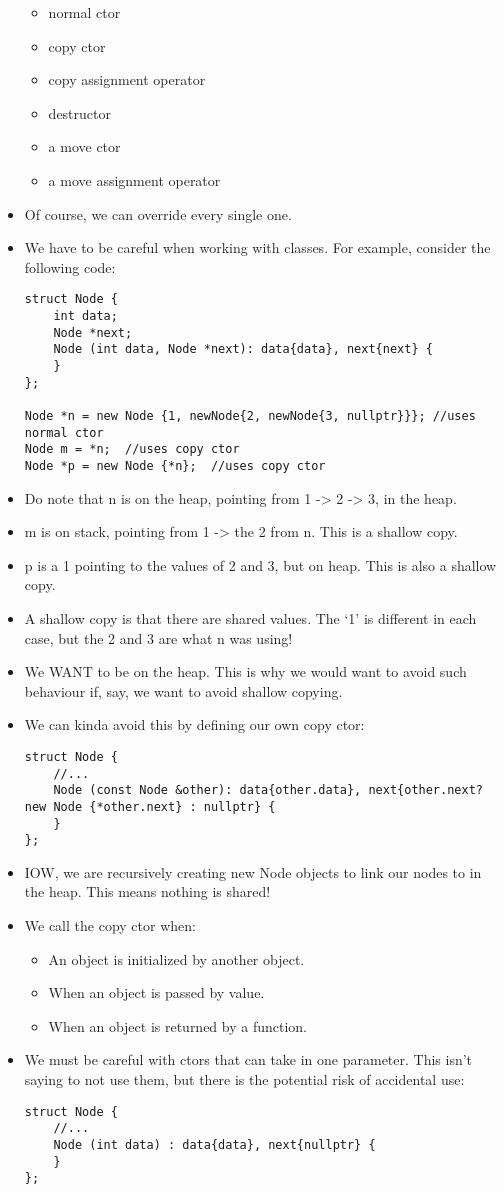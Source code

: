 \documentclass{article}
\begin{document}
\begin{itemize}
\begin{itemize}
\item normal ctor
\item copy ctor
\item copy assignment operator
\item destructor
\item a move ctor
\item a move assignment operator
\end{itemize}
\item Of course, we can override every single one.  
\item We have to be careful when working with classes.  For example, consider the following code:
\begin{lstlisting}
struct Node {
    int data;
    Node *next;
    Node (int data, Node *next): data{data}, next{next} {
    }
};

Node *n = new Node {1, newNode{2, newNode{3, nullptr}}}; //uses normal ctor
Node m = *n;  //uses copy ctor
Node *p = new Node {*n};  //uses copy ctor
\end{lstlisting}
\item Do note that n is on the heap, pointing from 1 -> 2 -> 3, in the heap.
\item m is on stack, pointing from 1 -> the 2 from n.  This is a shallow copy.
\item p is a 1 pointing to the values of 2 and 3, but on heap.  This is also a shallow copy.
\item A shallow copy is that there are shared values.  The `1' is different in each case, but the 2 and 3 are what n was using!  
\item We WANT to be on the heap.  This is why we would want to avoid such behaviour if, say, we want to avoid shallow copying.
\item We can kinda avoid this by defining our own copy ctor:
\begin{lstlisting}
struct Node {
    //...
    Node (const Node &other): data{other.data}, next{other.next? new Node {*other.next} : nullptr} {
    }
};  
\end{lstlisting}
\item IOW, we are recursively creating new Node objects to link our nodes to in the heap.  This means nothing is shared!
\item We call the copy ctor when:
\begin{itemize}
\item An object is initialized by another object.
\item When an object is passed by value.
\item When an object is returned by a function.
\end{itemize}
\item We must be careful with ctors that can take in one parameter.  This isn't saying to not use them, but there is the potential risk of accidental use:
\begin{lstlisting}
struct Node {
    //...
    Node (int data) : data{data}, next{nullptr} {
    }
};


\end{lstlisting}
\end{itemize}
\end{document}
